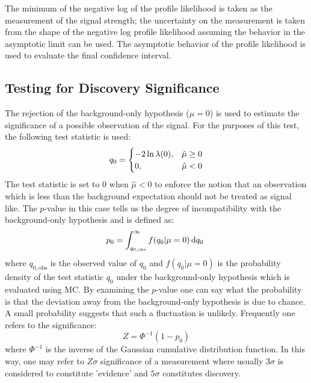 The minimum of the negative log of the profile likelihood 
is taken as the measurement of the signal strength; 
the uncertainty on the measurement is taken from the shape of the 
negative log profile likelihood assuming the behavior in the asymptotic
limit can be used.  The asymptotic behavior of the profile likelihood 
is used to evaluate the final confidence interval. 


\subsection{Testing for Discovery Significance}
The rejection of the background-only hypothesis ($\mu = 0$) is used 
to estimate the significance of a possible observation of the signal.
For the purposes of this test, the following test 
statistic is used:
\begin{equation}
q_{0} = 
\begin{cases}
\hfill -2 \ln \lambda(0),\hfill & \hat{\mu} \geq 0 \\
0,\hfill & \hat{\mu} < 0
\end{cases}
\label{eq:q0}
\end{equation}
The test statistic is set to $0$ when $\hat{\mu} < 0$ to enforce
the notion that an observation which is less than the background
expectation should not be treated as signal like. The $p$-value in this case
tells us the degree of incompatibility with the background-only hypothesis
and is defined as:
\begin{equation}
p_0=\int^{\infty }_{q_{0,\textrm{obs}}} f(q_0|\mu=0) \mathop{}\!\mathrm{d}q_0~
\label{eq:pvalue}
\end{equation}
where $q_{0,\textrm{obs}}$ is the observed value of $q_0$ and 
$f(q_0|\mu=0)$ is the probability density of the test statistic $q_0$ under
the background-only hypothesis which is evaluated using MC. %
By examining the $p$-value one can say what the probability is 
that the deviation away from the background-only hypothesis is due
to chance. A small probability suggests that such a fluctuation is
unlikely. Frequently one refers to the significance:
\begin{equation}
Z = \Phi^{-1}(1-p_0)
\label{eq:significance}
\end{equation}
where $\Phi^{-1}$ is the inverse of the Gaussian cumulative distribution 
function.
In this way, one may refer to $Z\sigma$ significance of a measurement 
where usually
$3\sigma$ is considered to constitute 'evidence' and $5\sigma$ constitutes
discovery.


